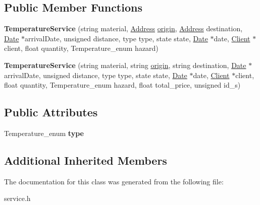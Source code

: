 \subsection*{Public Member Functions}
\begin{DoxyCompactItemize}
\item 
\mbox{\label{class_temperature_service_aeecc16594f858590729a79824f2efeff}} 
{\bfseries Temperature\+Service} (string material, \hyperlink{class_address}{Address} \hyperlink{class_service_a4abd0a104d97e5bdb8e8ca93bab31ce7}{origin}, \hyperlink{class_address}{Address} destination, \hyperlink{class_date}{Date} $\ast$arrival\+Date, unsigned distance, type type, state state, \hyperlink{class_date}{Date} $\ast$date, \hyperlink{class_client}{Client} $\ast$client, float quantity, Temperature\+\_\+enum hazard)
\item 
\mbox{\label{class_temperature_service_a980fd4745f1dc221fee79bff5f126ad5}} 
{\bfseries Temperature\+Service} (string material, string \hyperlink{class_service_a4abd0a104d97e5bdb8e8ca93bab31ce7}{origin}, string destination, \hyperlink{class_date}{Date} $\ast$arrival\+Date, unsigned distance, type type, state state, \hyperlink{class_date}{Date} $\ast$date, \hyperlink{class_client}{Client} $\ast$client, float quantity, Temperature\+\_\+enum hazard, float total\+\_\+price, unsigned id\+\_\+s)
\end{DoxyCompactItemize}
\subsection*{Public Attributes}
\begin{DoxyCompactItemize}
\item 
\mbox{\label{class_temperature_service_a1c6c01171d9ad6e56012440fb85a17bd}} 
Temperature\+\_\+enum {\bfseries type}
\end{DoxyCompactItemize}
\subsection*{Additional Inherited Members}


The documentation for this class was generated from the following file\+:\begin{DoxyCompactItemize}
\item 
service.\+h\end{DoxyCompactItemize}
